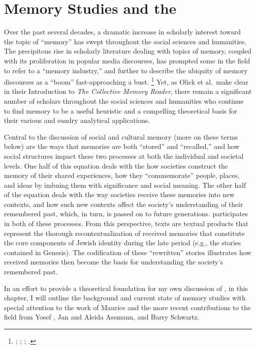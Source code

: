 
\chapter{Memory Studies and the \rwb}
\label{chap:memory}

Over the past several decades, a dramatic increase in scholarly interest toward the topic of ``memory'' has swept throughout the social sciences and humanities. The precipitous rise in scholarly literature dealing with topics of memory, coupled with its proliferation in popular media discourses, has prompted some in the field to refer to a ``memory industry,'' and further to describe the ubiquity of memory discourses as a ``boom'' fast-approaching a bust.%
    \footnote{%
        \Cite{rosenfeld_jmh2009};
        \cite{winter2006};
        \cite{berliner_aq2005};
        \cite{confino_ahr1997}.}
Yet, as Olick et al.~make clear in their Introduction to \emph{The Collective Memory Reader}, there remain a significant number of scholars throughout the social sciences and humanities who continue to find memory to be a useful heuristic and a compelling theoretical basis for their various and sundry analytical applications.%
    \autocite[3--6]{olick_olick-etal2011}

Central to the discussion of social and cultural memory (more on these terms below) are the ways that memories are both ``stored'' and ``recalled,'' and how social structures impact these two processes at both the individual and societal levels. One half of this equation deals with the how societies construct the memory of their shared experiences, how they ``commemorate'' people, places, and ideas by imbuing them with significance and social meaning. The other half of the equation deals with the way societies receive these memories into new contexts, and how such new contexts affect the society's understanding of their remembered past, which, in turn, is passed on to future generations. \rwb participates in both of these processes. From this perspective, \rwb texts are textual products that represent the thorough recontextualization of received memories that constitute the core components of Jewish identity during the late \secondtemple period (e.g., the stories contained in Genesis). The codification of these ``rewritten'' stories illustrates how received memories then become the basis for understanding the society's remembered past.

In an effort to provide a theoretical foundation for my own discussion of \rwb, in this chapter, I will outline the background and current state of memory studies with special attention to the work of Maurice \halbwachs and the more recent contributions to the field from Yosef \yerushalmi, Jan and Aleida Assmann, and Barry Schwartz.

